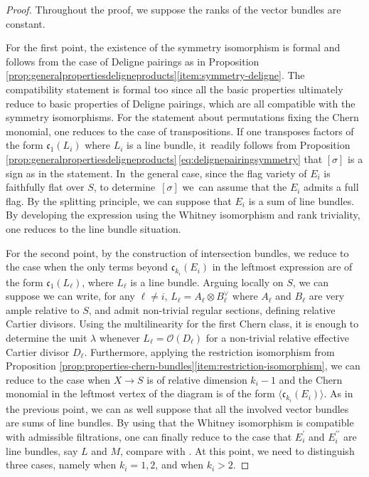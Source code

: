 \documentclass[11pt]{article}
\theoremstyle{plain}
\theoremstyle{definition}
\newcommand{\Ocal}{\mathcal O}
\newcommand{\cfrak}{\mathfrak c}
\newcommand{\bis}{\prime\prime}
\begin{document}
\begin{proof}
Throughout the proof, we suppose the ranks of the vector bundles are constant.

For the first point, the existence of the symmetry isomorphism is formal and follows from the case of Deligne pairings as in Proposition \ref{prop:generalpropertiesdeligneproducts}\eqref{item:symmetry-deligne}. The compatibility statement is formal too since all the basic properties ultimately reduce to basic properties of Deligne pairings, which are all compatible with the symmetry isomorphisms. For the statement about permutations fixing the Chern monomial, one reduces to the case of transpositions. If one transposes factors of the form $\cfrak_1(L_{i})$ where $L_{i}$ is a line bundle, it~readily follows from Proposition \ref{prop:generalpropertiesdeligneproducts}\,\eqref{eq:delignepairingsymmetry} that $[\sigma]$ is a sign as in the statement. In~the general case, since the flag variety of $E_i$ is faithfully flat over $S$, to determine~$[\sigma]$ we~can assume that the $E_i$ admits a full flag. By the splitting principle, we can suppose that $E_i$ is a sum of line bundles. By developing the expression using the Whitney isomorphism and rank triviality, one reduces to the line bundle situation.

For the second point, by the construction of intersection bundles, we reduce to the case when the only terms beyond $\cfrak_{k_{i}}(E_i)$ in the leftmost expression are of the form $\cfrak_1(L_\ell)$, where $L_\ell$ is a line bundle. Arguing locally on $S$, we can suppose we can write, for any $\ell \neq i$, $L_\ell = A_\ell \otimes B_\ell^{\vee}$ where $A_\ell$ and $B_\ell$ are very ample relative to $S$, and admit non-trivial regular sections, defining relative Cartier divisors. Using the multilinearity for the first Chern class, it is enough to determine the unit $\lambda$ whenever $L_\ell = \Ocal(D_{\ell})$ for a non-trivial relative effective Cartier divisor $D_\ell$. Furthermore, applying the restriction isomorphism from Proposition \ref{prop:properties-chern-bundles}\eqref{item:restriction-isomorphism}, we can reduce to the case when $X\to S$ is of relative dimension $k_{i}-1$ and the Chern monomial in the leftmost vertex of the diagram is of the form $\langle \cfrak_{k_{i}}(E_i) \rangle$. As in the previous point, we can as well suppose that all the involved vector bundles are sums of line bundles. By using that the Whitney isomorphism is compatible with admissible filtrations, one can finally reduce to the case that $E_{i}^{\prime}$ and $E_{i}^{\bis}$ are line bundles, say $L$ and $M$, compare with \cite[Cor.\,2.20]{Eriksson-Freixas-Wentworth}. At this point, we need to distinguish three cases, namely when $k_i = 1, 2$, and when $k_i>2$.


\end{proof}
\end{document}
